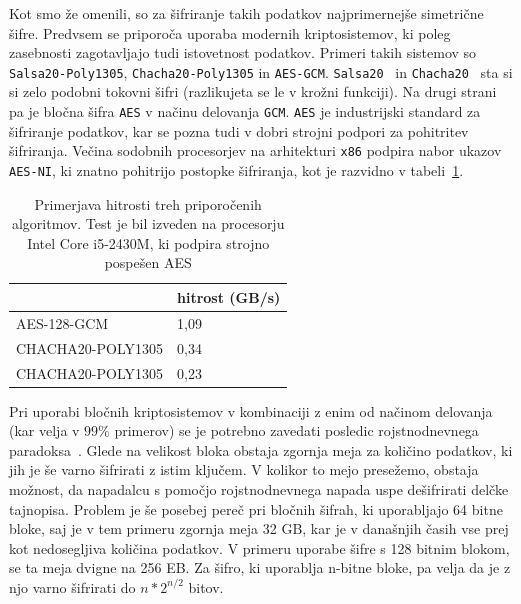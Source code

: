 \documentclass[12pt,a4paper,openany,tikz]{book}
\theoremstyle{plain}
\theoremstyle{definition}
\begin{document}
Kot smo že omenili, so za šifriranje takih podatkov najprimernejše simetrične šifre. Predvsem se priporoča uporaba modernih kriptosistemov, ki poleg zasebnosti zagotavljajo tudi istovetnost podatkov. Primeri takih sistemov so \texttt{Salsa20-Poly1305}, \texttt{Chacha20-Poly1305} in \texttt{AES-GCM}. \texttt{Salsa20}~\cite{bernstein2008salsa20} in \texttt{Chacha20}~\cite{bernstein2008chacha} sta si si zelo podobni tokovni šifri (razlikujeta se le v krožni funkciji). Na drugi strani pa je bločna šifra \texttt{AES} v načinu delovanja \texttt{GCM}. \texttt{AES} je industrijski standard za šifriranje podatkov, kar se pozna tudi v dobri strojni podpori za pohitritev šifriranja. Večina sodobnih procesorjev na arhitekturi \texttt{x86} podpira nabor ukazov \texttt{AES-NI}, ki znatno pohitrijo postopke šifriranja, kot je razvidno v tabeli~\ref{symmspeed}.

\begin{table}[]
\centering
\begin{tabular}{|l|l|}
\hline
                  & hitrost (GB/s) \\ \hline
AES-128-GCM       & 1,09           \\ \hline
CHACHA20-POLY1305 & 0,34           \\ \hline
CHACHA20-POLY1305 & 0,23           \\ \hline
\end{tabular}
\caption{Primerjava hitrosti treh priporočenih algoritmov. Test je bil izveden na procesorju Intel Core i5-2430M, ki podpira strojno pospešen AES}
\label{symmspeed}
\end{table}

Pri uporabi bločnih kriptosistemov v kombinaciji z enim od načinom delovanja (kar velja v $99\%$ primerov) se je potrebno zavedati posledic rojstnodnevnega paradoksa~\cite{wiki:bdayparadox}. Glede na velikost bloka obstaja zgornja meja za količino podatkov, ki jih je še varno šifrirati z istim ključem. V kolikor to mejo presežemo, obstaja možnost, da napadalcu s pomočjo rojstnodnevnega napada uspe dešifrirati delčke tajnopisa. Problem je še posebej pereč pri bločnih šifrah, ki uporabljajo 64 bitne bloke, saj je v tem primeru zgornja meja 32 GB, kar je v današnjih časih vse prej kot nedosegljiva količina podatkov. V primeru uporabe šifre s 128 bitnim blokom, se ta meja dvigne na 256 EB. Za šifro, ki uporablja n-bitne bloke, pa velja da je z njo varno šifrirati do $n*2^{n/2}$ bitov.

\
\end{document}
